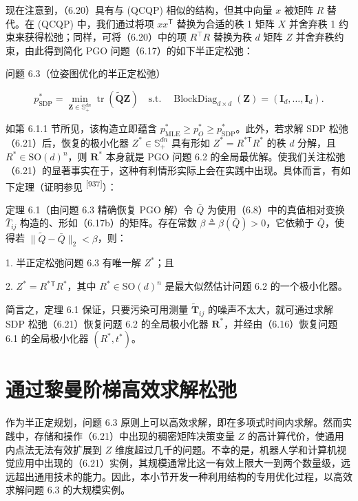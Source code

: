 现在注意到，（6.20）具有与 (QCQP) 相似的结构，但其中向量 $x$ 被矩阵 $R$ 替代。在 (QCQP) 中，我们通过将项 $x x ^ { \mathsf { T } }$ 替换为合适的秩 1 矩阵 $X$ 并舍弃秩 1 约束来获得松弛；同样，可将（6.20）中的项 $R ^ { \intercal } R$ 替换为秩 $d$ 矩阵 $Z$ 并舍弃秩约束，由此得到简化 PGO 问题（6.17）的如下半正定松弛：

问题 6.3（位姿图优化的半正定松弛）

\begin{equation}
p _ {\mathrm{SDP}} ^ {*} = \min _ {\boldsymbol {Z} \in \mathbb {S} _ {+} ^ {d n}} \operatorname{tr} \left(\tilde {\boldsymbol {Q}} \boldsymbol {Z}\right) \quad \text {s.t.} \quad \operatorname{BlockDiag} _ {d \times d} (\boldsymbol {Z}) = (\mathbf {I} _ {d}, \ldots , \mathbf {I} _ {d}).\tag{6.21}
\end{equation}

如第 6.1.1 节所见，该构造立即蕴含 $p _ { \mathrm { M L E } } ^ { * } \geq p _ { O } ^ { * } \geq p _ { \mathrm { S D P } } ^ { * }$。此外，若求解 SDP 松弛（6.21）后，恢复的极小化器 $Z ^ { * } \in \mathbb { S } _ { + } ^ { d n }$ 具有形如 $Z ^ { * } = R ^ { * \mathsf { T } } R ^ { * }$ 的秩 $d$ 分解，且 $R ^ { * } \in \mathrm { S O } ( d ) ^ { n }$，则 $\pmb { R } ^ { * }$ 本身就是 PGO 问题 6.2 的全局最优解。使我们关注松弛（6.21）的显著事实在于，这种有利情形实际上会在实践中出现。具体而言，有如下定理（证明参见 \textsuperscript{[937]}）：

定理 6.1（由问题 6.3 精确恢复 PGO 解）令 $\bar { Q }$ 为使用（6.8）中的真值相对变换 $\bar { T } _ { i j }$ 构造的、形如（6.17b）的矩阵。存在常数 $\beta \triangleq \beta ( \bar { Q } ) > 0$，它依赖于 $\bar { Q }$，使得若 $\| \tilde { Q } - \bar { Q } \| _ { 2 } < \beta$，则：

1. 半正定松弛问题 6.3 有唯一解 $Z ^ { * }$；且

2. $Z ^ { * } = R ^ { * } { } ^ { \mathsf { T } } R ^ { * }$，其中 $R ^ { * } \in \mathrm { S O } ( d ) ^ { n }$ 是最大似然估计问题 6.2 的一个极小化器。

简言之，定理 6.1 保证，只要污染可用测量 $\tilde { \pmb { T } } _ { i j }$ 的噪声不太大，就可通过求解 SDP 松弛（6.21）恢复问题 6.2 的全局极小化器 $\pmb { R } ^ { * }$，并经由（6.16）恢复问题 6.1 的全局极小化器 $( R ^ { * } , t ^ { * } )$。

\section{通过黎曼阶梯高效求解松弛}

作为半正定规划，问题 6.3 原则上可以高效求解，即在多项式时间内求解。然而实践中，存储和操作（6.21）中出现的稠密矩阵决策变量 $Z$ 的高计算代价，使通用内点法无法有效扩展到 $Z$ 维度超过几千的问题。不幸的是，机器人学和计算机视觉应用中出现的（6.21）实例，其规模通常比这一有效上限大一到两个数量级，远远超出通用技术的能力。因此，本小节开发一种利用结构的专用优化过程，以高效求解问题 6.3 的大规模实例。

